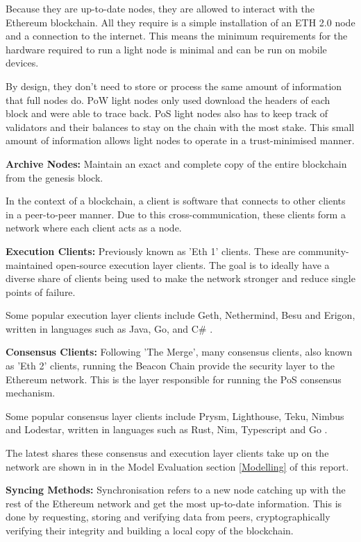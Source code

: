 Because they are up-to-date nodes, they are allowed to interact with the Ethereum blockchain.  All they require is a simple installation of an ETH 2.0 node and a connection to the internet. This means the minimum requirements for the hardware required to run a light node is minimal and can be run on mobile devices.

By design, they don't need to store or process the same amount of information that full nodes do. PoW light nodes only used download the headers of each block and were able to trace back. PoS light nodes also has to keep track of validators and their balances to stay on the chain with the most stake. This small amount of information allows light nodes to operate in a trust-minimised manner.

\textbf{Archive Nodes:}
Maintain an exact and complete copy of the entire blockchain from the genesis block. 

In the context of a blockchain, a client is software that connects to other clients in a peer-to-peer manner. Due to this cross-communication, these clients form a network where each client acts as a node. 

\textbf{Execution Clients: }
Previously known as 'Eth 1' clients. These are community-maintained open-source execution layer clients. The goal is to ideally have a diverse share of clients being used to make the network stronger and reduce single points of failure.

Some popular execution layer clients include Geth, Nethermind, Besu and Erigon, written in languages such as Java, Go, and C\# \cite{EthereumEthereum.org}. 

\textbf{Consensus Clients: }
Following 'The Merge', many consensus clients, also known as 'Eth 2' clients, running the Beacon Chain provide the security layer to the Ethereum network. This is the layer responsible for running the PoS consensus mechanism.

Some popular consensus layer clients include Prysm, Lighthouse, Teku, Nimbus and Lodestar, written in languages 
 such as Rust, Nim, Typescript and Go \cite{EthereumEthereum.org}. 

The latest shares these consensus and execution layer clients take up on the network are shown in  in the Model Evaluation section \ref{Modelling} of this report.

\textbf{Syncing Methods:} \newline 
Synchronisation refers to a new node catching up with the rest of the Ethereum network and get the most up-to-date information. This is done by requesting, storing and verifying data from peers, cryptographically verifying their integrity and building a local copy of the blockchain.

